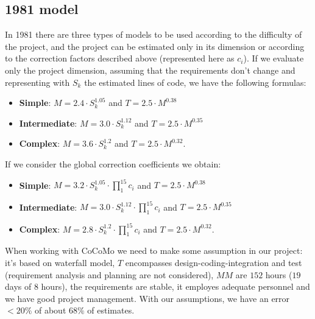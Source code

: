 \subsection{1981 model}
In 1981 there are three types of models to be used according to the difficulty of the project, and the project can be estimated only in its dimension or according to the correction factors described above (represented here as $c_i$).
If we evaluate only the project dimension, assuming that the requirements don't change and representing with $S_k$ the estimated lines of code, we have the following formulas:
\begin{itemize}
    \item \textbf{Simple}: $M = 2.4 \cdot S_k^{1.05}$ and $T = 2.5 \cdot M^{0.38}$
    \item \textbf{Intermediate}: $M = 3.0 \cdot S_k^{1.12}$ and $T = 2.5 \cdot M^{0.35}$
    \item \textbf{Complex}: $M = 3.6 \cdot S_k^{1.2}$ and $T = 2.5 \cdot M^{0.32}$.
\end{itemize}
If we consider the global correction coefficients we obtain:
\begin{itemize}
    \item \textbf{Simple}: $M = 3.2 \cdot S_k^{1.05} \cdot \prod_{1}^{15} c_i$ and $T = 2.5 \cdot M^{0.38}$
    \item \textbf{Intermediate}: $M = 3.0 \cdot S_k^{1.12} \cdot \prod_{1}^{15} c_i$ and $T = 2.5 \cdot M^{0.35}$
    \item \textbf{Complex}: $M = 2.8 \cdot S_k^{1.2} \cdot \prod_{1}^{15} c_i$ and $T = 2.5 \cdot M ^{0.32}$.
\end{itemize}
When working with CoCoMo we need to make some assumption in our project: it's based on waterfall model, $T$ encompasses design-coding-integration and test (requirement analysis and planning are not considered), $MM$ are $152$ hours ($19$ days of $8$ hours), the requirements are stable, it employes adequate personnel and we have good project management.
With our assumptions, we have an error $< 20\%$ of about $68\%$ of estimates.

